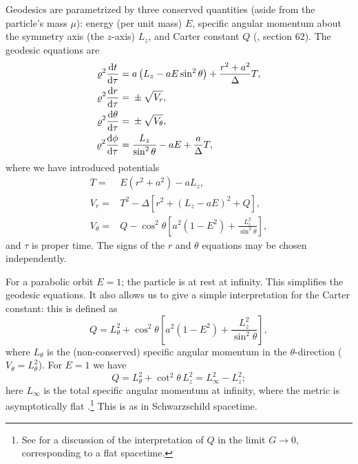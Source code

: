 Geodesics are parametrized by three conserved quantities (aside from the particle's mass $\mu$): energy (per unit mass) $E$, specific angular momentum about the symmetry axis (the $z$-axis) $L_z$, and Carter constant $Q$ (\citealt{Carter1968, Chandrasekhar1998}, section 62). The geodesic equations are
\begin{subequations}
\begin{align}
\varrho^2 \frac{\mathrm{d} {t}}{\mathrm{d} {\tau}} = {} & a\left(L_z - aE\sin^2 \theta\right) + \frac{r^2 + a^2}{\Delta}T,\\
\varrho^2 \frac{\mathrm{d} {r}}{\mathrm{d} {\tau}} = {} & \pm \sqrt{V_r},\\
\varrho^2 \frac{\mathrm{d} {\theta}}{\mathrm{d} {\tau}} = {} & \pm \sqrt{V_\theta},\\
\varrho^2 \frac{\mathrm{d} {\phi}}{\mathrm{d} {\tau}} = {} & \frac{L_z}{\sin^2 \theta} - aE + \frac{a}{\Delta}T,
\end{align}
\end{subequations}
where we have introduced potentials
\begin{subequations}
\begin{align}
T = {} & E\left(r^2 +a^2\right) - aL_z,\\
V_r = {} & T^2 - \Delta\left[r^2 + \left(L_z - aE\right)^2 + Q\right],\\
V_\theta = {} & Q - \cos^2 \theta\left[a^2\left(1 - E^2\right) + \frac{L_z^2}{\sin^2\theta}\right],
\end{align}
\end{subequations}
and $\tau$ is proper time. The signs of the $r$ and $\theta$ equations may be chosen independently.

For a parabolic orbit $E = 1$; the particle is at rest at infinity. This simplifies the geodesic equations. It also allows us to give a simple interpretation for the Carter constant: this is defined as
\begin{equation}
Q = L_\theta^2 + \cos^2\theta\left[a^2\left(1 - E^2\right) + \frac{L_z^2}{\sin^2\theta}\right],
\end{equation}
where $L_\theta$ is the (non-conserved) specific angular momentum in the $\theta$-direction ($V_\theta = L_\theta^2$). For $E = 1$ we have
\begin{equation}
Q = L_\theta^2 + \cot^2\theta\, L_z^2 = L_\infty^2 - L_z^2;
\end{equation}
here $L_\infty$ is the total specific angular momentum at infinity, where the metric is asymptotically flat \citep{DeFelice1980}.\footnote{See \citet{Rosquist2009} for a discussion of the interpretation of $Q$ in the limit $G \rightarrow 0$, corresponding to a flat spacetime.} This is as in Schwarzschild spacetime.

